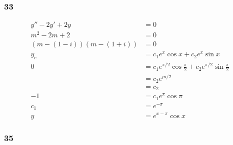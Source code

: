 \documentclass{article}
\begin{document}
\subsubsection{33}

\begin{align*}
  y'' - 2 y' + 2 y            & = 0                                                                       \\
  m^2 - 2 m + 2               & = 0                                                                       \\
  (m - (1 - i)) (m - (1 + i)) & = 0                                                                       \\
  y_c                         & = c_1 e^x \cos x + c_2 e^x \sin x                                         \\
  0                           & = c_1 e^{\pi / 2} \cos \frac{\pi}{2} + c_2 e^{\pi / 2} \sin \frac{\pi}{2} \\
                              & = c_2 e^{pi / 2}                                                          \\
                              & = c_2                                                                     \\
  -1                          & = c_1 e^\pi \cos \pi                                                      \\
  c_1                         & = e^{-\pi}                                                                \\
  y                           & = e^{x - \pi} \cos x
\end{align*}

\subsubsection{35}
\end{document}
